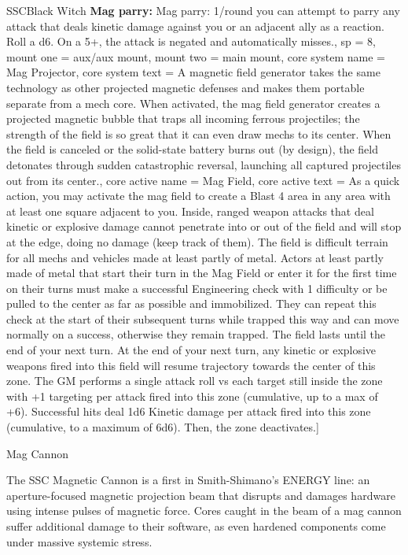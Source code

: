 \begin{mech}{SSC}{Black Witch}
{\textbf{Mag parry:}  Mag parry: 1/round you can attempt to parry any attack that deals kinetic damage against you or an adjacent ally as a reaction. Roll a d6. On a 5+, the attack is negated and automatically misses.},
sp = 8,
mount one = aux/aux mount,
mount two = main mount,
core system name = Mag Projector,
core system text = {A magnetic field generator takes the same technology as other projected magnetic defenses and makes them portable separate from a mech core. When activated, the mag field generator creates a projected magnetic bubble that traps all incoming ferrous projectiles; the strength of the field is so great that it can even draw mechs to its center. When the field is canceled or the solid-state battery burns out (by design), the field detonates through sudden catastrophic reversal, launching all captured projectiles out from its center.},
core active name = Mag Field,  
core active text = {As a quick action, you may activate the mag field to create a Blast 4 area in any area with at least one square adjacent to you. Inside, ranged weapon attacks that deal kinetic or explosive damage cannot penetrate into or out of the field and will stop at the edge, doing no damage (keep track of them). The field is difficult terrain for all mechs and vehicles made at least partly of metal. Actors at least partly made of metal that start their turn in the Mag Field or enter it for the first time on their turns must make a successful Engineering check with 1 difficulty or be pulled to the center as far as possible and immobilized. They can repeat this check at the start of their subsequent turns while trapped this way and can move normally on a success, otherwise they remain trapped. The field lasts until the end of your next turn. At the end of your next turn, any kinetic or explosive weapons fired into this field will resume trajectory towards the center of this zone. The GM performs a single attack roll vs each target still inside the zone with +1 targeting per attack fired into this zone (cumulative, up to a max of +6). Successful hits deal 1d6 Kinetic damage per attack fired into this zone (cumulative, to a maximum of 6d6). Then, the zone deactivates.}] 


Mag Cannon

The SSC Magnetic Cannon is a first in Smith-Shimano’s ENERGY line: an aperture-focused magnetic projection beam that disrupts and damages hardware using intense pulses of magnetic force. Cores caught in the beam of a mag cannon suffer additional damage to their software, as even hardened components come under massive systemic stress.


\end{mech}

